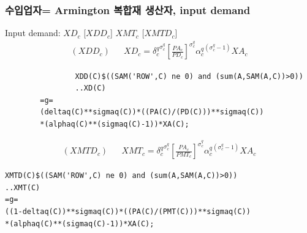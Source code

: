 \documentclass[10pt,compress,slidetop,%
			   hyperref={unicode},xcolor={svgnames},%
			   t]{beamer}
\begin{document}
\begin{frame}[fragile]
	\frametitle{수입업자= Armington 복합재 생산자, input demand}
\begin{scriptsize}
Input demand: $XD_c$ [$XDD_c$] $XMT_c$ [$XMTD_c$]
\begin{eqnarray*}
(XDD_c)& &XD_c={\delta^q_c}^{\sigma^q_c}\left[\frac{PA_c}{PD_c}\right]^{\sigma^q_c}{\alpha^q_c}^{(\sigma^q_c-1)}XA_c
\end{eqnarray*}


\begin{verbatim}
				XDD(C)$((SAM('ROW',C) ne 0) and (sum(A,SAM(A,C))>0))
				..XD(C)
		=g=
		(deltaq(C)**sigmaq(C))*((PA(C)/(PD(C)))**sigmaq(C))
		*(alphaq(C)**(sigmaq(C)-1))*XA(C);
\end{verbatim}

\begin{eqnarray*}
(XMTD_c)& &XMT_c={\delta^q_c}^{\sigma^q_c}\left[\frac{PA_c}{PMT_c}\right]^{\sigma^q_c}{\alpha^q_c}^{(\sigma^q_c-1)}XA_c
\end{eqnarray*}

\begin{verbatim}
XMTD(C)$((SAM('ROW',C) ne 0) and (sum(A,SAM(A,C))>0))
..XMT(C)
=g=
((1-deltaq(C))**sigmaq(C))*((PA(C)/(PMT(C)))**sigmaq(C))
*(alphaq(C)**(sigmaq(C)-1))*XA(C);
\end{verbatim}

\end{scriptsize}
\end{frame}
\end{document}
